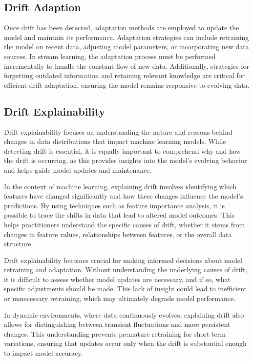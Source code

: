 \subsection{Drift Adaption}\label{subsec:drift_adaption}
Once drift has been detected, adaptation methods are employed to update the
model and maintain its performance. Adaptation strategies can include
retraining the model on recent data, adjusting model parameters, or
incorporating new data sources. In stream learning, the adaptation process must
be performed incrementally to handle the constant flow of new data.
Additionally, strategies for forgetting outdated information and retaining
relevant knowledge are critical for efficient drift adaptation, ensuring the
model remains responsive to evolving data.

\subsection{Drift Explainability}\label{subsec:drift_explainability}
Drift explainability focuses on understanding the nature and reasons behind
changes in data distributions that impact machine learning models. While
detecting drift is essential, it is equally important to comprehend why and how
the drift is occurring, as this provides insights into the model's evolving
behavior and helps guide model updates and maintenance.

In the context of machine learning, explaining drift involves identifying which
features have changed significantly and how these changes influence the model's
predictions. By using techniques such as feature importance analysis, it is
possible to trace the shifts in data that lead to altered model outcomes. This
helps practitioners understand the specific causes of drift, whether it stems
from changes in feature values, relationships between features, or the overall
data structure.

Drift explainability becomes crucial for making informed decisions about model
retraining and adaptation. Without understanding the underlying causes of
drift, it is difficult to assess whether model updates are necessary, and if
so, what specific adjustments should be made. This lack of insight could lead
to inefficient or unnecessary retraining, which may ultimately degrade model
performance.

In dynamic environments, where data continuously evolves, explaining drift also
allows for distinguishing between transient fluctuations and more persistent
changes. This understanding prevents premature retraining for short-term
variations, ensuring that updates occur only when the drift is substantial
enough to impact model accuracy.